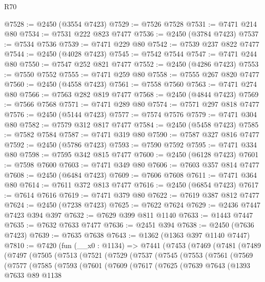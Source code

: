 \begin{lexlean}{R70}
\begin{coremodule}
@7528 := @2450 (@3554 @7423)
@7529 := @7526 @7528
@7531 := @7471 @214 @80
@7534 := @7531 @222 @823 @7477
@7536 := @2450 (@3784 @7423)
@7537 := @7534 @7536
@7539 := @7471 @229 @80
@7542 := @7539 @237 @822 @7477
@7544 := @2450 (@4028 @7423)
@7545 := @7542 @7544
@7547 := @7471 @244 @80
@7550 := @7547 @252 @821 @7477
@7552 := @2450 (@4286 @7423)
@7553 := @7550 @7552
@7555 := @7471 @259 @80
@7558 := @7555 @267 @820 @7477
@7560 := @2450 (@4558 @7423)
@7561 := @7558 @7560
@7563 := @7471 @274 @80
@7566 := @7563 @282 @819 @7477
@7568 := @2450 (@4844 @7423)
@7569 := @7566 @7568
@7571 := @7471 @289 @80
@7574 := @7571 @297 @818 @7477
@7576 := @2450 (@5144 @7423)
@7577 := @7574 @7576
@7579 := @7471 @304 @80
@7582 := @7579 @312 @817 @7477
@7584 := @2450 (@5458 @7423)
@7585 := @7582 @7584
@7587 := @7471 @319 @80
@7590 := @7587 @327 @816 @7477
@7592 := @2450 (@5786 @7423)
@7593 := @7590 @7592
@7595 := @7471 @334 @80
@7598 := @7595 @342 @815 @7477
@7600 := @2450 (@6128 @7423)
@7601 := @7598 @7600
@7603 := @7471 @349 @80
@7606 := @7603 @357 @814 @7477
@7608 := @2450 (@6484 @7423)
@7609 := @7606 @7608
@7611 := @7471 @364 @80
@7614 := @7611 @372 @813 @7477
@7616 := @2450 (@6854 @7423)
@7617 := @7614 @7616
@7619 := @7471 @379 @80
@7622 := @7619 @387 @812 @7477
@7624 := @2450 (@7238 @7423)
@7625 := @7622 @7624
@7629 := @2436 @7447 @7423 @394 @397
@7632 := @7629 @399 @811 @1140
@7633 := @1443 @7447
@7635 := @7632 @7633 @7477
@7636 := @2451 @394
@7638 := @2450 (@7636 @7423)
@7639 := @7635 @7638
@7643 := @1362 (@1363 @397 @1140 @7447)
@7810 := @7420
    (fun (__x0 : @1134) =>
    @7441
      (@7453
        (@7469
          (@7481
            (@7489
              (@7497
                (@7505
                  (@7513
                    (@7521
                      (@7529
                        (@7537
                          (@7545
                            (@7553
                              (@7561
                                (@7569
                                  (@7577
                                    (@7585
                                      (@7593
                                        (@7601
                                          (@7609
                                            (@7617
                                              (@7625
                                                (@7639
                                                  @7643
                                                  (@1393
                                                    @7633
                                                    @89
                                                    @1138

\end{coremodule}
\end{lexlean}
